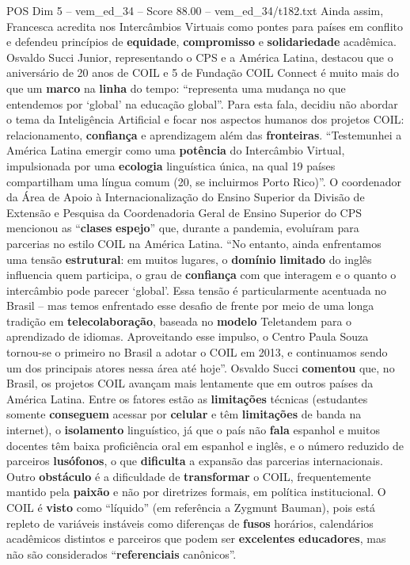 \begin{textsample}{POS Dim 5 – vem\_ed\_34 – Score 88.00 – vem\_ed\_34/t182.txt}
Ainda assim, Francesca acredita nos Intercâmbios Virtuais como pontes para países em conflito e defendeu princípios de \textbf{equidade}, \textbf{compromisso} e \textbf{solidariedade} acadêmica.
Osvaldo Succi Junior, representando o CPS e a América Latina, destacou que o aniversário de 20 anos de COIL e 5 de Fundação COIL Connect é muito mais do que um \textbf{marco} na \textbf{linha} do tempo: “representa uma mudança no que entendemos por ‘global’ na educação global”.
Para esta fala, decidiu não abordar o tema da Inteligência Artificial e focar nos aspectos humanos dos projetos COIL: relacionamento, \textbf{confiança} e aprendizagem além das \textbf{fronteiras}. “Testemunhei a América Latina emergir como uma \textbf{potência} do Intercâmbio Virtual, impulsionada por uma \textbf{ecologia} linguística única, na qual 19 países compartilham uma língua comum (20, se incluirmos Porto Rico)”.
O coordenador da Área de Apoio à Internacionalização do Ensino Superior da Divisão de Extensão e Pesquisa da Coordenadoria Geral de Ensino Superior do CPS mencionou as “\textbf{clases} \textbf{espejo}” que, durante a pandemia, evoluíram para parcerias no estilo COIL na América Latina. “No entanto, ainda enfrentamos uma tensão \textbf{estrutural}: em muitos lugares, o \textbf{domínio} \textbf{limitado} do inglês influencia quem participa, o grau de \textbf{confiança} com que interagem e o quanto o intercâmbio pode parecer ‘global’.
Essa tensão é particularmente acentuada no Brasil – mas temos enfrentado esse desafio de frente por meio de uma longa tradição em \textbf{telecolaboração}, baseada no \textbf{modelo} Teletandem para o aprendizado de idiomas.
Aproveitando esse impulso, o Centro Paula Souza tornou-se o primeiro no Brasil a adotar o COIL em 2013, e continuamos sendo um dos principais atores nessa área até hoje”.
Osvaldo Succi \textbf{comentou} que, no Brasil, os projetos COIL avançam mais lentamente que em outros países da América Latina.
Entre os fatores estão as \textbf{limitações} técnicas (estudantes somente \textbf{conseguem} acessar por \textbf{celular} e têm \textbf{limitações} de banda na internet), o \textbf{isolamento} linguístico, já que o país não \textbf{fala} espanhol e muitos docentes têm baixa proficiência oral em espanhol e inglês, e o número reduzido de parceiros \textbf{lusófonos}, o que \textbf{dificulta} a expansão das parcerias internacionais.
Outro \textbf{obstáculo} é a dificuldade de \textbf{transformar} o COIL, frequentemente mantido pela \textbf{paixão} e não por diretrizes formais, em política institucional.
O COIL é \textbf{visto} como “líquido” (em referência a Zygmunt Bauman), pois está repleto de variáveis instáveis como diferenças de \textbf{fusos} horários, calendários acadêmicos distintos e parceiros que podem ser \textbf{excelentes} \textbf{educadores}, mas não são considerados “\textbf{referenciais} canônicos”.

\end{textsample}
